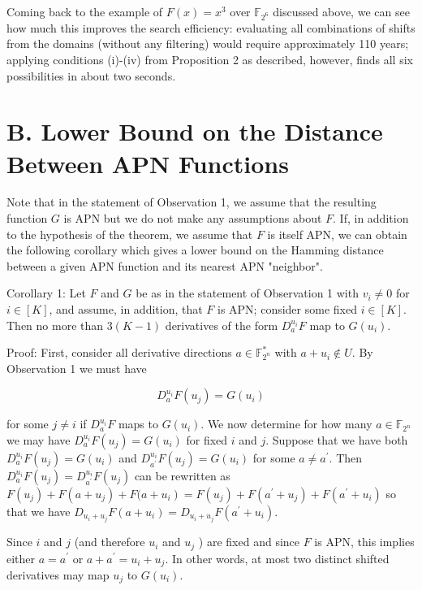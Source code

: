 \documentclass[10pt]{article}
\begin{document}
Coming back to the example of $F(x)=x^{3}$ over $\mathbb{F}_{2^{6}}$ discussed above, we can see how much this improves the search efficiency: evaluating all combinations of shifts from the domains (without any filtering) would require approximately 110 years; applying conditions (i)-(iv) from Proposition 2 as described, however, finds all six possibilities in about two seconds.

\section*{B. Lower Bound on the Distance Between APN Functions}
Note that in the statement of Observation 1, we assume that the resulting function $G$ is APN but we do not make any assumptions about $F$. If, in addition to the hypothesis of the theorem, we assume that $F$ is itself APN, we can obtain the following corollary which gives a lower bound on the Hamming distance between a given APN function and its nearest APN "neighbor".

Corollary 1: Let $F$ and $G$ be as in the statement of Observation 1 with $v_{i} \neq 0$ for $i \in[K]$, and assume, in addition, that $F$ is APN; consider some fixed $i \in[K]$. Then no more than $3(K-1)$ derivatives of the form $D_{a}^{u_{i}} F$ map to $G\left(u_{i}\right)$.

Proof: First, consider all derivative directions $a \in \mathbb{F}_{2^{n}}^{*}$ with $a+u_{i} \notin U$. By Observation 1 we must have

$$
D_{a}^{u_{i}} F\left(u_{j}\right)=G\left(u_{i}\right)
$$

for some $j \neq i$ if $D_{a}^{u_{i}} F$ maps to $G\left(u_{i}\right)$. We now determine for how many $a \in \mathbb{F}_{2^{n}}$ we may have $D_{a}^{u_{i}} F\left(u_{j}\right)=G\left(u_{i}\right)$ for fixed $i$ and $j$. Suppose that we have both $D_{a}^{u_{i}} F\left(u_{j}\right)=G\left(u_{i}\right)$ and $D_{a^{\prime}}^{u_{i}} F\left(u_{j}\right)=G\left(u_{i}\right)$ for some $a \neq a^{\prime}$. Then $D_{a}^{u_{i}} F\left(u_{j}\right)= D_{a^{\prime}}^{u_{i}} F\left(u_{j}\right)$ can be rewritten as $F\left(u_{j}\right)+F\left(a+u_{j}\right)+F(a+ \left.u_{i}\right)=F\left(u_{j}\right)+F\left(a^{\prime}+u_{j}\right)+F\left(a^{\prime}+u_{i}\right)$ so that we have $D_{u_{i}+u_{j}} F\left(a+u_{i}\right)=D_{u_{i}+u_{j}} F\left(a^{\prime}+u_{i}\right)$.

Since $i$ and $j$ (and therefore $u_{i}$ and $u_{j}$ ) are fixed and since $F$ is APN, this implies either $a=a^{\prime}$ or $a+a^{\prime}=u_{i}+u_{j}$. In other words, at most two distinct shifted derivatives may map $u_{j}$ to $G\left(u_{i}\right)$.
\end{document}
